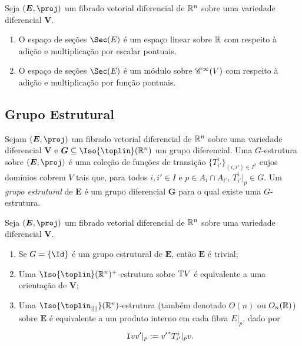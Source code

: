\begin{exerc}
Seja $(\bm E,\proj)$ um fibrado vetorial diferencial de $\mathbb{R}^n$ sobre uma variedade diferencial $\bm V$.
	\begin{enumerate}
	\item O espaço de seções $\Sec(E)$ é um espaço linear sobre $\mathbb{R}$ com respeito à adição e multiplicação por escalar pontuais.
	\item O espaço de seções $\Sec(E)$ é um módulo sobre $\mathscr{C}^\infty(V)$ com respeito à adição e multiplicação por função pontuais.
	\end{enumerate}
\end{exerc}


\subsection{Grupo Estrutural}

\begin{defi}
Sejam $(\bm E,\proj)$ um fibrado vetorial diferencial de $\mathbb{R}^n$ sobre uma variedade diferencial $\bm V$ e $\bm G \subseteq \Iso{\toplin}(\R^n)$ um grupo diferencial. Uma $G$-estrutura sobre $(\bm E,\proj)$ é uma coleção de funções de transição $\{T^i_{i'}\}_{(i,i') \in I^2}$ cujos domínios cobrem $V$ tais que, para todos $i,i' \in I$ e $p \in A_i \cap A_{i'}$, $T^i_{i'}|_p \in G$. Um \emph{grupo estrutural} de $\bm E$ é um grupo diferencial $\bm G$ para o qual existe uma $G$-estrutura.
\end{defi}

\begin{ex}
Seja $(\bm E,\proj)$ um fibrado vetorial diferencial de $\mathbb{R}^n$ sobre uma variedade diferencial $\bm V$.
	\begin{enumerate}
	\item Se $G=\{\Id\}$ é um grupo estrutural de $\bm E$, então $\bm E$ é trivial;
	
	\item Uma $\Iso{\toplin}(\R^n)^+$-estrutura sobre $\mathrm{T} V$ é equivalente a uma orientação de $\bm V$;
	
	\item Uma $\Iso{\toplin_{\nor{}}}(\R^n)$-estrutura (também denotado $O(n)$ ou  $O_n(\mathbb{R})$) sobre $\bm E$ é equivalente a um produto interno em cada fibra $E|_p$, dado por
		\begin{equation*}
		\mathtt I{v}{v'}|_p := {v'}^* T^i_{i'}|_p v.
		\end{equation*}
	\end{enumerate}
\end{ex}


